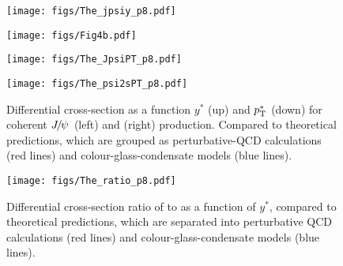 \documentclass{appolb}
\begin{document}
\begin{figure}[htp]
    \centering
   \begin{center}
     \begin{minipage}[t]{0.41\linewidth}
        \centering
        \texttt{[image: figs/The\_jpsiy\_p8.pdf]}
     \end{minipage}  
      \begin{minipage}[t]{0.52\linewidth}
       \centering
    \texttt{[image: figs/Fig4b.pdf]}
     \end{minipage}
   \end{center}

     \begin{center}
        \begin{minipage}[t]{0.4\linewidth}
        \centering
       \texttt{[image: figs/The\_JpsiPT\_p8.pdf]}
      \end{minipage}
       \begin{minipage}[t]{0.52\linewidth}
       \centering
   \texttt{[image: figs/The\_psi2sPT\_p8.pdf]}
      \end{minipage}      
     \end{center}
     \hfil
    \caption{Differential cross-section as a function $y^{*}$ (up) and $p_{\mathrm{T}}^{*}$ (down) for coherent ${{J\mskip -3mu/\mskip -2mu\psi\mskip 2mu}}$ (left) and \psitwos (right) production. Compared to theoretical predictions, which are grouped as perturbative-QCD calculations (red lines) and colour-glass-condensate models (blue lines).}
    \label{fig:theo_y}
\end{figure}
\begin{figure}[htp]
\vspace{-1cm}
    \centering
    \begin{minipage}[t]{0.52\linewidth}
        \centering
        \texttt{[image: figs/The\_ratio\_p8.pdf]}
    \end{minipage}
    \caption{Differential cross-section ratio of \psitwos to \jpsi as a function of $y^*$, compared to theoretical predictions, which are separated into perturbative QCD calculations (red lines) and colour-glass-condensate models (blue lines).}
    \label{fig:theo_ratio}
\end{figure}
\end{document}
